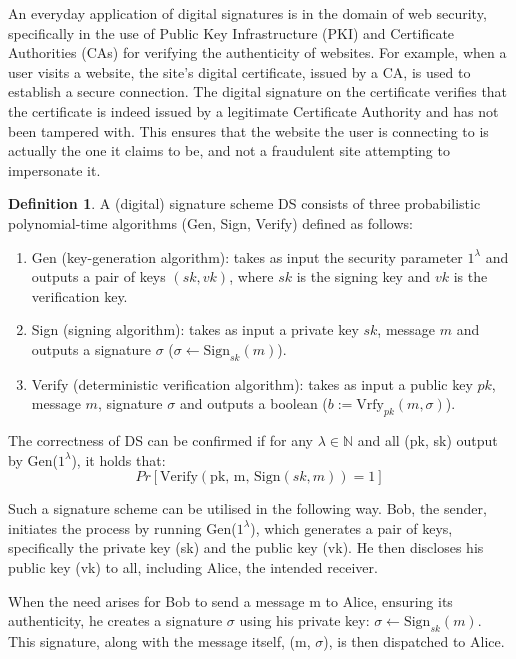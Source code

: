 \documentclass[]{final_report}
\theoremstyle{definition}
\newtheorem{definition}{Definition}[chapter]
\begin{document}
An everyday application of digital signatures is in the domain of web security, specifically in the use of Public Key Infrastructure (PKI) and Certificate Authorities (CAs) for verifying the authenticity of websites. For example, when a user visits a website, the site's digital certificate, issued by a CA, is used to establish a secure connection. The digital signature on the certificate verifies that the certificate is indeed issued by a legitimate Certificate Authority and has not been tampered with. This ensures that the website the user is connecting to is actually the one it claims to be, and not a fraudulent site attempting to impersonate it. 

\begin{definition}
\label{def:digital signature}
A (digital) signature scheme DS consists of three probabilistic polynomial-time algorithms (Gen, Sign, Verify) defined as follows:
\begin{enumerate}
    \item Gen (key-generation algorithm): takes as input the security parameter $1^\lambda$ and outputs a pair of keys $(sk ,vk)$, where $sk$ is the signing key and $vk$ is the verification key.
    \item Sign (signing algorithm): takes as input a private key $sk$, message $m$ and outputs a signature $\sigma$ ($\sigma \leftarrow \text{Sign}_{sk}(m)$).
    \item Verify (deterministic verification algorithm):  takes as input a public key $pk$, message $m$, signature $\sigma$ and outputs a boolean ($b := \text{Vrfy}_{pk}(m, \sigma)$).
\end{enumerate}
\end{definition}

The correctness of DS can be confirmed if for any $\lambda \in \mathbb{N}$ and all (pk, sk) output by Gen($1^\lambda$), it holds that: 
\[ Pr[\text{Verify}(\text{pk, m, Sign}(sk, m)) = 1]\]
 
Such a signature scheme can be utilised in the following way.
Bob, the sender, initiates the process by running Gen($1^\lambda$), which generates a pair of keys, specifically the private key (sk) and the public key (vk). He then discloses his public key (vk) to all, including Alice, the intended receiver.

When the need arises for Bob to send a message m to Alice, ensuring its authenticity, he creates a signature $\sigma$ using his private key: $\sigma \leftarrow \text{Sign}_{sk}(m)$. This signature, along with the message itself, (m, $\sigma$), is then dispatched to Alice.
\end{document}
